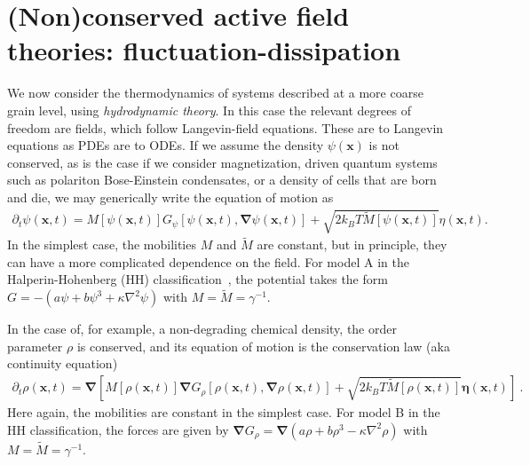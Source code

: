 \section{(Non)conserved active field theories: fluctuation-dissipation}



We now consider the thermodynamics of systems described at a more coarse grain level, using \emph{hydrodynamic theory}. 
In this case the relevant degrees of freedom are fields, which follow Langevin-field equations.
These are to Langevin equations as PDEs are to ODEs.
If we assume the density $\psi(\bm x)$ is not conserved, as is the case if we consider magnetization, driven quantum systems such as polariton Bose-Einstein condensates, or a density of cells that are born and die, we may generically write the equation of motion as
%
\begin{align}
    \partial_t \psi(\bm x, t) 
    = M[\psi(\bm x, t)] G_\psi[\psi(\bm x, t), \bm \nabla \psi(\bm x, t)] 
    + \sqrt{ 2 k_B T \tilde M[\psi(\bm x, t)] } \eta(\bm x, t).
\end{align}
%
In the simplest case, the mobilities $M$ and $\tilde{M}$ are constant, but in principle, they can have a more complicated dependence on the field.
For model A in the Halperin-Hohenberg (HH) classification~\cite{HohenbergRMP}, the potential takes the form $G = -(a \psi + b \psi^3 + \kappa \nabla^2 \psi)$ with $M=\tilde{M}=\gamma^{-1}$. 
%

In the case of, for example, a non-degrading chemical density, the order parameter $\rho$ is conserved, and its equation of motion is the conservation law (aka continuity equation)
%
\begin{align}
    \partial_t \rho(\bm x, t)
    = 
    \bm \nabla
    \left[
        M[\rho(\bm x, t)]
        \bm \nabla G_\rho[\rho(\bm x, t), \bm \nabla\rho(\bm x, t)]
        + \sqrt{ 2 k_B T \tilde M[\rho(\bm x, t)] }
        \bm \eta(\bm x, t)
    \right]~.
\end{align}
%
Here again, the mobilities are constant in the simplest case.
For model B in the HH classification, the forces are given by $\bm \nabla G_\rho = \bm \nabla (a \rho + b \rho^3 - \kappa \nabla^2 \rho)$ with $M = \tilde{M} = \gamma^{-1}$.

